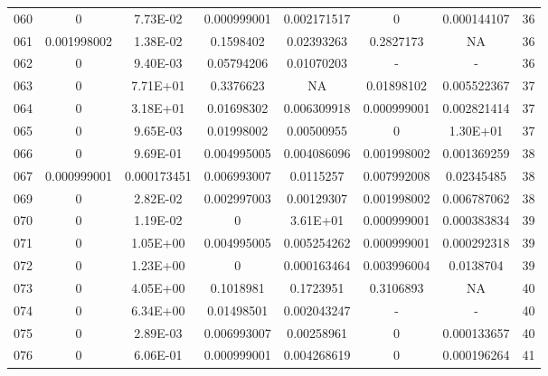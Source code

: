 {\begin{longtable}{cccccccc}
060 & {\color{red}0} & 7.73E-02 & {\color{red}0.000999001} & {\color{red}0.002171517} & {\color{red}0} & {\color{red}0.000144107} & 36 \\
061 & {\color{red}0.001998002} & {\color{red}1.38E-02} & 0.1598402 & {\color{red}0.02393263} & 0.2827173 & NA & 36 \\
062 & {\color{red}0} & {\color{red}9.40E-03} & 0.05794206 & {\color{red}0.01070203} & - & - &  36 \\
063 & {\color{red}0} & 7.71E+01 & 0.3376623 & NA & {\color{red}0.01898102} & {\color{red}0.005522367} & 37 \\
064 & {\color{red}0} & 3.18E+01 & {\color{red}0.01698302} & {\color{red}0.006309918} & {\color{red}0.000999001} & {\color{red}0.002821414} & 37 \\
065 & {\color{red}0} & {\color{red}9.65E-03} & {\color{red}0.01998002} & {\color{red}0.00500955} & {\color{red}0} & 1.30E+01 & 37 \\
066 & {\color{red}0} & 9.69E-01 & {\color{red}0.004995005} & {\color{red}0.004086096} & {\color{red}0.001998002} & {\color{red}0.001369259} & 38 \\
067 & {\color{red}0.000999001} & {\color{red}0.000173451} & {\color{red}0.006993007} & {\color{red}0.0115257} & {\color{red}0.007992008} & {\color{red}0.02345485} & 38 \\
069 & {\color{red}0} & {\color{red}2.82E-02} & {\color{red}0.002997003} & {\color{red}0.00129307} & {\color{red}0.001998002} & {\color{red}0.006787062} & 38 \\
070 & {\color{red}0} & {\color{red}1.19E-02} & {\color{red}0} & 3.61E+01 & {\color{red}0.000999001} & {\color{red}0.000383834} & 39 \\
071 & {\color{red}0} & 1.05E+00 & {\color{red}0.004995005} & {\color{red}0.005254262} & {\color{red}0.000999001} & {\color{red}0.000292318} & 39 \\
072 & {\color{red}0} & 1.23E+00 & {\color{red}0} & {\color{red}0.000163464} & {\color{red}0.003996004} & {\color{red}0.0138704} & 39 \\
073 & {\color{red}0} & 4.05E+00 & 0.1018981 & 0.1723951 & 0.3106893 & NA & 40 \\
074 & {\color{red}0} & 6.34E+00 & {\color{red}0.01498501} & {\color{red}0.002043247} & - & - &  40 \\
075 & {\color{red}0} & {\color{red}2.89E-03} & {\color{red}0.006993007} & {\color{red}0.00258961} & {\color{red}0} & {\color{red}0.000133657} & 40 \\
076 & {\color{red}0} & 6.06E-01 & {\color{red}0.000999001} & {\color{red}0.004268619} & {\color{red}0} & {\color{red}0.000196264} & 41 \\

\end{longtable}}
